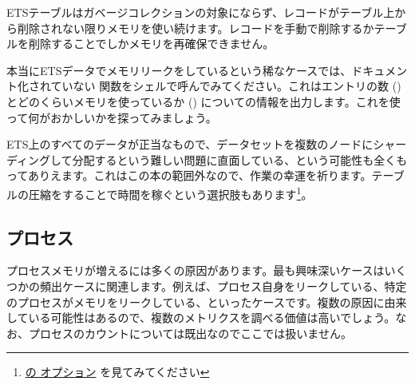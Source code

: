 ETSテーブルはガベージコレクションの対象にならず、レコードがテーブル上から削除されない限りメモリを使い続けます。レコードを手動で削除するかテーブルを削除することでしかメモリを再確保できません。

本当にETSデータでメモリリークをしているという稀なケースでは、ドキュメント化されていない  関数をシェルで呼んでみてください。これはエントリの数 () とどのくらいメモリを使っているか () についての情報を出力します。これを使って何がおかしいかを探ってみましょう。

ETS上のすべてのデータが正当なもので、データセットを複数のノードにシャーディングして分配するという難しい問題に直面している、という可能性も全くもってありえます。これはこの本の範囲外なので、作業の幸運を祈ります。テーブルの圧縮をすることで時間を稼ぐという選択肢もあります\footnote{\href{http://www.erlang.org/doc/man/ets.html\#new-2}{ の  オプション} を見てみてください}。

\subsection{プロセス}

プロセスメモリが増えるには多くの原因があります。最も興味深いケースはいくつかの頻出ケースに関連します。例えば、プロセス自身をリークしている、特定のプロセスがメモリをリークしている、といったケースです。複数の原因に由来している可能性はあるので、複数のメトリクスを調べる価値は高いでしょう。なお、プロセスのカウントについては既出なのでここでは扱いません。

